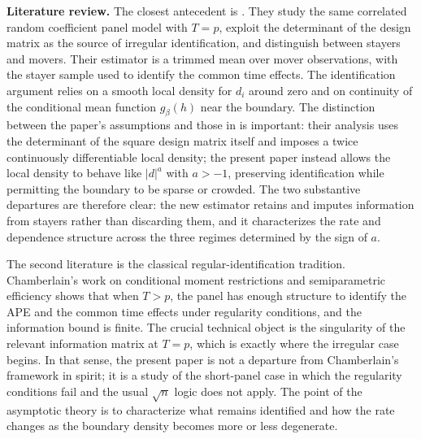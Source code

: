 \documentclass{article}
\begin{document}
\textbf{Literature review.} The closest antecedent is \cite{grahampowell}. They study the same correlated random coefficient panel model with $T=p$, exploit the determinant of the design matrix as the source of irregular identification, and distinguish between stayers and movers. Their estimator is a trimmed mean over mover observations, with the stayer sample used to identify the common time effects. The identification argument relies on a smooth local density for $d_i$ around zero and on continuity of the conditional mean function $g_\beta(h)$ near the boundary. The distinction between the paper's assumptions and those in \cite{grahampowell} is important: their analysis uses the determinant of the square design matrix itself and imposes a twice continuously differentiable local density; the present paper instead allows the local density to behave like $|d|^{a}$ with $a>-1$, preserving identification while permitting the boundary to be sparse or crowded. The two substantive departures are therefore clear: the new estimator retains and imputes information from stayers rather than discarding them, and it characterizes the rate and dependence structure across the three regimes determined by the sign of $a$.

The second literature is the classical regular-identification tradition. Chamberlain's work on conditional moment restrictions and semiparametric efficiency \cite{CHAMBERLAIN1982,CHAMBERLAIN1987,CHAMBERLAIN1992} shows that when $T>p$, the panel has enough structure to identify the APE and the common time effects under regularity conditions, and the information bound is finite. The crucial technical object is the singularity of the relevant information matrix at $T=p$, which is exactly where the irregular case begins. In that sense, the present paper is not a departure from Chamberlain's framework in spirit; it is a study of the short-panel case in which the regularity conditions fail and the usual $\sqrt{n}$ logic does not apply. The point of the asymptotic theory is to characterize what remains identified and how the rate changes as the boundary density becomes more or less degenerate.
\end{document}
